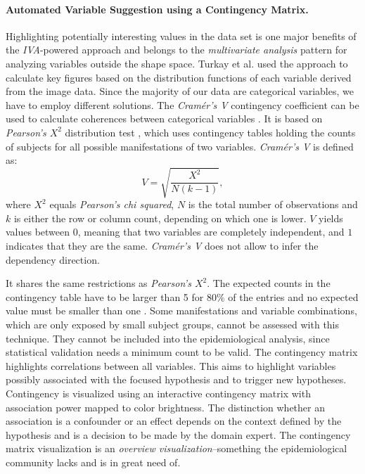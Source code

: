 \documentclass[journal]{style/vgtc} 			          %
\newcommand{\rem}[1]{\textcolor{red}{\sout{#1}}}
\begin{document}
\paragraph{Automated Variable Suggestion using a Contingency Matrix.}
Highlighting potentially interesting values in the data set is one major benefits of the \emph{IVA}-powered approach and belongs to the \emph{multivariate analysis} pattern for analyzing variables outside the shape space.
%
Turkay et al. \cite{Turkay2013} used the approach to calculate key figures based on the distribution functions of each variable derived from the image data.
%
Since the majority of our data are categorical variables, we have to employ different solutions.
%
The \emph{Cram\'{e}r's V} contingency coefficient can be used to calculate coherences between categorical variables \cite{CramerV}.
%
It is based on \emph{Pearson's $X^2$} distribution test \cite{ChiSquare}, which uses contingency tables holding the counts of subjects for all possible manifestations of two variables.
%
\emph{Cram\'{e}r's V} is defined as:
\begin{equation}
V = \sqrt{\frac{X^2}{N(k-1)}},
\end{equation}
where $X^2$ equals \emph{Pearson's chi squared}, $N$ is the total number of observations and $k$ is either the row or column count, depending on which one is lower.
%
$V$ yields values between $0$, meaning that two variables are completely independent, and $1$ indicates that they are the same.
%
\emph{Cram\'{e}r's V} does not allow to infer the dependency direction.
%

It shares the same restrictions as \emph{Pearson's $X^2$}.
%
The expected counts in the contingency table have to be larger than 5 for $80\%$ of the entries and no expected value must be smaller than one \cite{Cochran1952}.
%
Some manifestations and variable combinations, which are only exposed by small subject groups, cannot be assessed with this technique.
%
They cannot be included into the epidemiological analysis, since statistical validation needs a minimum count to be valid.
%
The contingency matrix highlights correlations between all variables. %
%
This aims to highlight variables possibly associated with the focused hypothesis and to trigger new hypotheses.
%
Contingency is visualized using an interactive contingency matrix with association power mapped to color brightness.
%
The distinction whether an association is a confounder or an effect depends on the context defined by the hypothesis and is a decision to be made by the domain expert.
%
The contingency matrix visualization is an \emph{overview visualization}--something the epidemiological community lacks and is in great need of.
\end{document}
